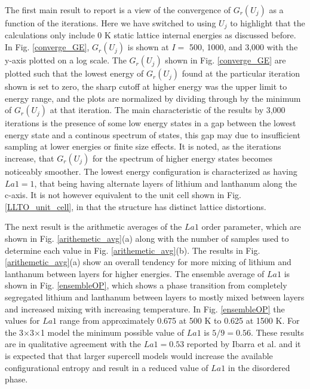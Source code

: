 \documentclass[aps,pre,reprint,superscriptaddress,showkeys]{revtex4-1}
\begin{document}
The first main result to report is a view of the convergence of $G_r(U_j)$ as a function of the iterations. Here we have switched to using $U_j$ to highlight that the calculations only include 0 K static lattice internal energies as discussed before. In Fig. \ref{converge_GE},  $G_r(U_j)$ is shown at  $I= $ 500, 1000, and 3,000 with the y-axis plotted on a log scale. The  $G_r(U_j)$ shown in Fig. \ref{converge_GE}  are plotted such that the lowest energy of $G_r(U_j)$ found at the particular iteration shown is set to zero, the sharp cutoff at higher energy was the upper limit to energy range, and the plots are normalized by dividing through by the minimum of $G_r(U_j)$ at that iteration.  The main characteristic of the results by 3,000 iterations is the presence of some low energy states in a gap between the lowest energy state and a continous spectrum of states, this gap may due to insufficient sampling at lower energies or finite size effects. It is noted, as the iterations increase, that $G_r(U_j)$ for the spectrum of higher energy states becomes noticeably smoother.  The lowest energy configuration is  characterized as having  $La1=1$, that being having alternate layers of lithium and lanthanum along the c-axis. It is not however equivalent to the unit cell shown in Fig. \ref{LLTO_unit_cell}, in that the structure has distinct lattice distortions. 


The next result is the arithmetic averages of the $La1$  order parameter, which are  shown in Fig. \ref{arithemetic_avg}(a) along with the number of samples used to determine each value in Fig. \ref{arithemetic_avg}(b). The results in Fig. \ref{arithemetic_avg}(a) show an overall tendency for more mixing of lithium and lanthanum between layers for higher energies. The ensemble average of $La1$ is shown in Fig. \ref{ensembleOP}, which shows a phase transition from completely segregated lithium and lanthanum between layers to mostly mixed between layers and increased mixing with increasing temperature. In Fig. \ref{ensembleOP} the values for $La1$ range from approximately 0.675 at 500 K to 0.625 at 1500 K.  For the 3$\times$3$\times$1 model the minimum possible value of $La1$ is $5/9 = 0.56$. These results are in qualitative agreement with the $La1=0.53$ reported by Ibarra et al. \cite{P4mmmstrucuture}  and it is expected that that larger supercell models would increase the available configurational entropy and result in a reduced value of $La1$ in the disordered phase. 
\end{document}
